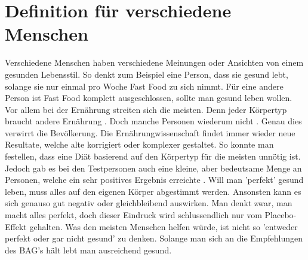 \section{Definition für verschiedene Menschen}
\authortoc{\jonas}{\sectionident}
Verschiedene Menschen haben verschiedene Meinungen oder Ansichten von einem gesunden Lebensstil. So denkt zum Beispiel eine Person, dass sie gesund lebt, solange sie nur einmal pro Woche Fast Food zu sich nimmt. Für eine andere Person ist Fast Food komplett ausgeschlossen, sollte man gesund leben wollen. Vor allem bei der Ernährung streiten sich die meisten. Denn jeder Körpertyp braucht andere Ernährung \cite{all-about-body-type-eating}. Doch manche Personen wiederum nicht \cite{all-about-body-type-eating}. Genau dies verwirrt die Bevölkerung.
\newline
Die Ernährungwissenschaft findet immer wieder neue Resultate, welche alte korrigiert oder komplexer gestaltet. So konnte man festellen, dass eine Diät basierend auf den Körpertyp für die meisten unnötig ist. Jedoch gab es bei den Testpersonen auch eine kleine, aber bedeutsame Menge an Personen, welche ein sehr positives Ergebnis erreichte \cite{all-about-body-type-eating}.
\newline
\newline
Will man 'perfekt' gesund leben, muss alles auf den eigenen Körper abgestimmt werden. Ansonsten kann es sich genauso gut negativ oder gleichbleibend auswirken. Man denkt zwar, man macht alles perfekt, doch dieser Eindruck wird schlussendlich nur vom Placebo-Effekt gehalten.
\newline
\newline
Was den meisten Menschen helfen würde, ist nicht so 'entweder perfekt oder gar nicht gesund' zu denken. Solange man sich an die Empfehlungen des BAG's hält lebt man ausreichend gesund.
